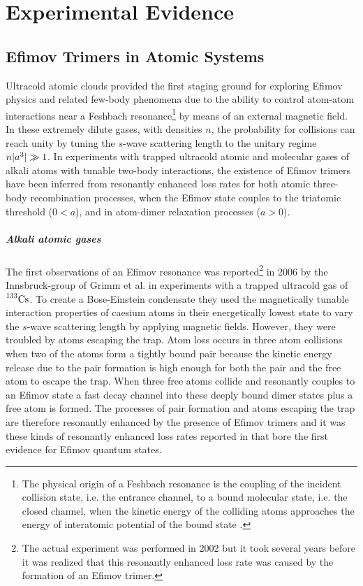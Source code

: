 \chapter{Experimental Evidence}
\section{Efimov Trimers in Atomic Systems}
Ultracold atomic clouds provided the first staging ground for exploring Efimov physics and related few-body phenomena due to the ability to control atom-atom interactions near a Feshbach resonance\footnote{The physical origin of a Feshbach resonance is the coupling of the incident collision state, i.e. the entrance channel, to a bound molecular state, i.e. the closed channel, when the kinetic energy of the colliding atoms approaches the energy of interatomic potential of the bound state \cite{Feshbach}.} by means of an external magnetic field. In these extremely dilute gases, with densities $n$, the probability for collisions can reach unity by tuning the $s$-wave scattering length to the unitary regime $n\lvert a^3\rvert\gg1$. In experiments with trapped ultracold atomic and molecular gases of alkali atoms with tunable two-body interactions, the existence of Efimov trimers have been inferred from resonantly enhanced loss rates for both atomic three-body recombination processes, when the Efimov state couples to the triatomic threshold ($0<a$), and in atom-dimer relaxation processes ($a>0$). 
\paragraph{Alkali atomic gases} 
The first observations of an Efimov resonance was reported\footnote{The actual experiment was performed in 2002 but it took several years before it was realized that this resonantly enhanced loss rate was caused by the formation of an Efimov trimer.} in 2006 by the Innsbruck-group of Grimm et al. in experiments with a trapped ultracold gas of $\prescript{133}{}{\mathrm{Cs}}$. To create a Bose-Einstein condensate they used the magnetically tunable interaction properties of caesium atoms in their energetically lowest state to vary the $s$-wave scattering length by applying magnetic fields. However, they were troubled by atoms escaping the trap. Atom loss occurs in three atom collisions when two of the atoms form a tightly bound pair because the kinetic energy release due to the pair formation is high enough for both the pair and the free atom to escape the trap. When three free atoms collide and resonantly couples to an Efimov state a fast decay channel into these deeply bound dimer states plus a free atom is formed. The processes of pair formation and atoms escaping the trap are therefore resonantly enhanced by the presence of Efimov trimers and it was these kinds of resonantly enhanced loss rates reported in \cite{Grimm:2006} that bore the first evidence for Efimov quantum states.

